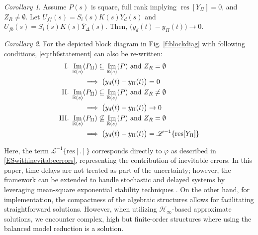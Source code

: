 \documentclass[journal]{IEEEtran}
\newcommand{\Laplace}{\mathscr{L}}
\theoremstyle{remark}
\newtheorem{corollary}{Corollary}
\DeclareMathOperator*{\im}{Im}
\DeclareMathOperator*{\res}{res}
\begin{document}
\begin{corollary} \label{coro:squareextunc}
Assume $P(s)$ is square, full rank implying $\res[Y_\Pi]=0$,  and $ Z_R \ne \emptyset$. Let $U_{ff}(s)=S_i(s)K(s)Y_d(s)$ and $U_{fb}(s)=S_i(s)K(s)\bar{Y}_\Delta(s)$. Then, $\bigl( y_d(t)-{y}_\Pi(t)\bigr) \to 0$.
\end{corollary}
\begin{corollary} \label{coro:relaxationsUNC}
For the depicted block diagram in Fig. \ref{f:blockdiag} with following conditions, \eqref{eq:th6statement} can also be re-written:
\begin{align}
\text{I. } \im_{\mathbb{R}(s)}&(P_\Pi) \subseteq \im_{\mathbb{R}(s)}(P) \text{ and } Z_{R} = \emptyset\  \nonumber\\
&\implies  \bigl( y_d(t)-y_\Pi(t) \bigr) = 0  \nonumber\\
\text{II. }\im_{\mathbb{R}(s)}&(P_\Pi) \subseteq \im_{\mathbb{R}(s)}(P) \text{ and } Z_{R} \ne \emptyset \nonumber\\ &\implies  \bigl( y_d(t)-y_\Pi(t) \bigr) \to 0 \nonumber \\
\text{III. }\im_{\mathbb{R}(s)}&(P_\Pi) \not\subseteq \im_{\mathbb{R}(s)}(P) \text{ and } Z_{R} = \emptyset \nonumber\\ &\implies  \bigl( y_d(t)-y_\Pi(t) \bigr) = \Laplace^{-1}\{ \normalfont 
 \text{res}[Y_\Pi]\}  \nonumber
\end{align}
\end{corollary}
Here, the term \( \Laplace^{-1}\{\text{res}[.]\} \) corresponds directly to \(\varphi\) as described in \eqref{ESwithinevitabeerrors}, representing the contribution of inevitable errors. In this paper, time delays are not treated as part of the uncertainty; however, the framework can be extended to handle stochastic and delayed systems by leveraging mean-square exponential stability techniques \cite{9410357}.
On the other hand, for implementation, the compactness of the algebraic structures allows for facilitating straightforward solutions. However, when utilizing $\mathcal{H}_\infty$-based approximate solutions, we encounter complex, high but finite-order structures where using the balanced model reduction is a solution.
\end{document}
